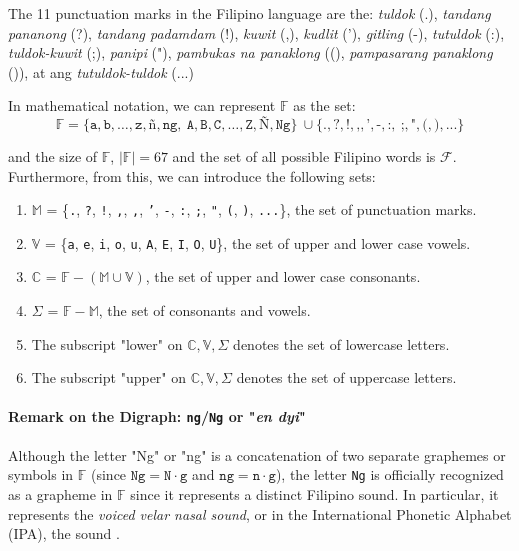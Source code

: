 The 11 punctuation marks in the Filipino language are the: \textit{tuldok} (.),
\textit{tandang pananong} (?), \textit{tandang padamdam} (!), \textit{kuwit} (,),
\textit{kudlit} ('), \textit{\textit{gitling}} (-), \textit{tutuldok} (:),
\textit{tuldok-kuwit} (;), \textit{panipi} ("), \textit{pambukas na panaklong}
((), \textit{pampasarang panaklong} ()), at ang \textit{tutuldok-tuldok} (...)

In mathematical notation, we can represent \(\mathbb{F}\) as the set:
\[
      \mathbb{F} = \{\texttt{a},\texttt{b},\dots,\texttt{z},\texttt{ñ},\texttt{ng},   \
      \texttt{A},\texttt{B},\texttt{C},\dots,\texttt{Z},\texttt{Ñ},\texttt{Ng}\}         \
      \cup \{\texttt{.},\texttt{?},\texttt{!},\texttt{,},\texttt{'},\texttt{-},\texttt{:}, \
      \texttt{;},\texttt{"},\texttt{(},\texttt{)}, \texttt{...}\}
\]

and the size of \(\mathbb{F}\), \(|\mathbb{F}| = 67\) and the set of all possible Filipino words is $\mathcal{F}$. Furthermore, from this, we can introduce the following sets:
\begin{enumerate}
      \item \(\mathbb{M}\) = \{\texttt{.}, \texttt{?}, \texttt{!}, \texttt{,}, \texttt{,}, \texttt{'}, \texttt{-}, \texttt{:}, \texttt{;}, \texttt{"}, \texttt{(}, \texttt{)}, \texttt{...}\}, the set of punctuation marks.
      \item \(\mathbb{V}\) = \{\texttt{a}, \texttt{e}, \texttt{i}, \texttt{o}, \texttt{u}, \texttt{A}, \texttt{E}, \texttt{I}, \texttt{O}, \texttt{U}\}, the set of upper and lower case vowels.
      \item \(\mathbb{C}\) = \(\mathbb{F} - (\mathbb{M} \cup \mathbb{V})\),
            the set of upper and lower case consonants.
      \item \(\Sigma\) = \(\mathbb{F} - \mathbb{M}\), the set of consonants and vowels.
      \item The subscript "lower" on \(\mathbb{C}, \mathbb{V}, \Sigma\) denotes the set of lowercase letters.
      \item The subscript "upper" on \(\mathbb{C}, \mathbb{V}, \Sigma\) denotes the set of uppercase letters.
\end{enumerate}

\paragraph{Remark on the Digraph: \texttt{ng}/\texttt{Ng} or "\textit{en dyi}"}

Although the letter "Ng" or "ng" is a concatenation of two separate graphemes or
symbols in \(\mathbb{F}\) (since \(\texttt{Ng} = \texttt{N}\cdot\texttt{g}\) and
\(\texttt{ng} = \texttt{n}\cdot\texttt{g}\)), the letter \texttt{Ng} is officially recognized
as a grapheme in \(\mathbb{F}\) since it represents a distinct Filipino sound.
In particular, it represents the \textit{voiced velar nasal sound}, or in the International
Phonetic Alphabet (IPA), the \textipa{N} sound \cite{Malabonga_2009}.


